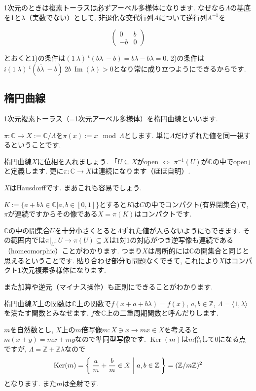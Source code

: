 \documentclass{jsarticle}
\newcommand{\CC}{\mathbb{C}}
\newcommand{\ZZ}{\mathbb{Z}}
\newcommand{\makeop}[1]{\mathop{\mathrm{#1}}\nolimits}
\def\Im{\makeop{Im}}
\def\Ker{\makeop{Ker}}
\theoremstyle{definition}
\numberwithin{theorem}{section}
\begin{document}
1次元のときは複素トーラスは必ずアーベル多様体になります. なぜなら$\Lambda$の基底を1と$\lambda$（実数でない）として, 非退化な交代行列$A$について逆行列$A^{-1}$を

\begin{equation*}
\begin{pmatrix}
0 & b \\
-b & 0
\end{pmatrix}
\end{equation*}

とおくと1)の条件は$(1\ \lambda)\ {}^t(b\lambda\ -b) = b\lambda - b\lambda = 0$.
2)の条件は$i(1\ \lambda)\ {}^t(b\tilde\lambda\ -b)\ 2b\ \Im(\lambda) > 0$となり常に成り立つようにできるからです.

\subsection{楕円曲線}
1次元複素トーラス（=1次元アーベル多様体）を楕円曲線といいます.

$\pi: \CC\rightarrow X := \CC/\Lambda$を$\pi(x) := x \mod \Lambda$とします. 単に$\Lambda$だけずれた値を同一視するということです.

楕円曲線$X$に位相を入れましょう. 「$U\subseteq X$がopen $\Leftrightarrow$ $\pi^{-1}(U)$が$\CC$の中でopen」と定義します. 更に$\pi: \CC \rightarrow X$は連続になります（ほぼ自明）.

$X$はHausdorffです. まあこれも容易でしょう.

$K := \{a+b\lambda \in \CC | a, b \in [0, 1]\}$とすると$K$は$C$の中でコンパクト(有界閉集合)で, $\pi$が連続ですからその像である$X = \pi(K)$はコンパクトです.

$\CC$の中の開集合$U$を十分小さくとると$\Lambda$ずれた値が入らないようにもできます. その範囲内では$\pi|_U: U \rightarrow \pi(U) \subseteq X$は1対1の対応がつき逆写像も連続である（homeomorphic）ことがわかります. つまり$X$は局所的には$\CC$の開集合と同じと思えるということです. 貼り合わせ部分も問題なくできて, これにより$X$はコンパクト1次元複素多様体になります.

また加算や逆元（マイナス操作）も正則にできることがわかります.

楕円曲線$X$上の関数は$\CC$上の関数で$f(x+a+b\lambda) = f(x)$, $a, b \in\ZZ$, $\Lambda = \langle1, \lambda\rangle$を満たす関数とみなせます. $f$を$\CC$上の二重周期関数と呼んだりします.

$m$を自然数とし, $X$上の$m$倍写像$m: X \ni x \rightarrow mx \in X$を考えると$m(x+y) = mx+my$なので準同型写像です. $\Ker(m)$は$m$倍して0になる点ですが, $\Lambda = \ZZ + \ZZ\lambda$なので
\[
\Ker(m) = \Set{\frac{a}{m} + \frac{b}{m}\in X | a, b \in \ZZ} = (\ZZ/m\ZZ)^2
\]
となります. また$m$は全射です.
\end{document}
